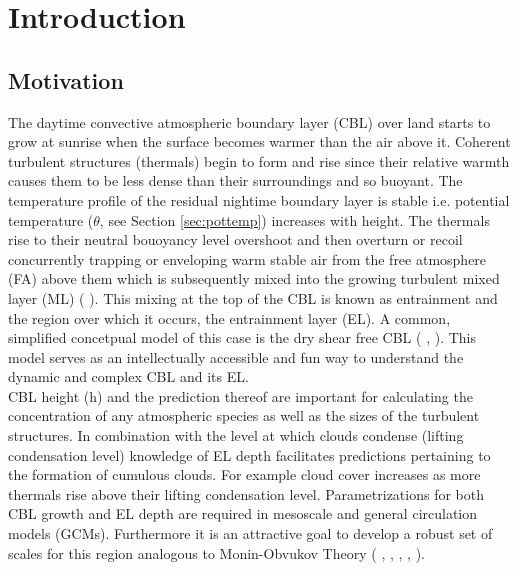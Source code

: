 
\chapter{Introduction} 
\label{ch:Introduction}
\setlength{\parindent}{0cm}

\section{Motivation}
\label{sec:Mot}

The daytime convective atmospheric boundary layer (\acs{CBL}) over land starts to grow at sunrise when the surface becomes warmer than the air above it.  Coherent turbulent structures (thermals) begin to form and rise since their relative warmth causes them to be less dense than their surroundings and so buoyant.  The temperature profile of the residual nightime boundary layer is stable i.e. potential temperature ($\theta$, see Section \ref{sec:pottemp}) increases with height.  The thermals rise to their neutral bouoyancy level overshoot and then overturn or recoil concurrently trapping or enveloping warm stable air from the free atmosphere (FA) above them which is subsequently mixed into the growing turbulent mixed layer (\acs{ML}) (\citeauthor{Stull-BLMetIntro} \citeyear{Stull-BLMetIntro}).  This mixing at the top of the \acs{CBL} is known as entrainment and the region over which it occurs, the entrainment layer (\acs{EL}). A common, simplified concetpual model of this case is the dry shear free \acs{CBL} (\citeauthor{SullMoengStev} \citeyear{SullMoengStev}, \citeauthor{FedConzMir04} \citeyear{FedConzMir04} \citeauthor{BrooksFowler2} \citeyear{BrooksFowler2}). This model serves as an intellectually accessible and fun way to understand the dynamic and complex \acs{CBL} and its \acs{EL}.\\

\acs{CBL} height (h) and the prediction thereof are important for calculating the concentration of any atmospheric species as well as the sizes of the turbulent structures.  In combination with the level at which clouds condense (lifting condensation level) knowledge of \acs{EL} depth facilitates predictions pertaining to the formation of cumulous clouds.  For example cloud cover increases as more thermals rise above their lifting condensation level.  Parametrizations for both \acs{CBL} growth and \acs{EL} depth are required in mesoscale and general circulation models (\acs{GCM}s).  Furthermore it is an attractive goal to develop a robust set of scales for this region analogous to Monin-Obvukov Theory (\citeauthor{Stull-BLMetIntro} \citeyear{Stull-BLMetIntro}, \citeauthor{Traum11} \citeyear{Traum11}, \citeauthor{SteynBaldHoff} \citeyear{SteynBaldHoff}, \citeauthor{StullNelEl} \citeyear{StullNelEl}, \citeauthor{Sorbjan} \citeyear{Sorbjan}).\\

